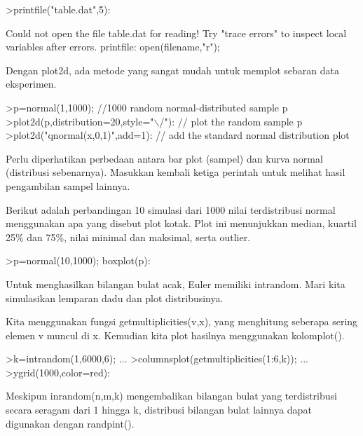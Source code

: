 \documentclass[a4paper,10pt]{article}
\begin{document}
\begin{eulernotebook}
\begin{eulercomment}
\begin{eulercomment}
\begin{eulerprompt}
>printfile("table.dat",5):
\end{eulerprompt}
\begin{euleroutput}
  Could not open the file
  table.dat
  for reading!
  Try "trace errors" to inspect local variables after errors.
  printfile:
      open(filename,"r");
\end{euleroutput}
\begin{eulercomment}
Dengan plot2d, ada metode yang sangat mudah untuk memplot sebaran data
eksperimen.
\end{eulercomment}
\begin{eulerprompt}
>p=normal(1,1000); //1000 random normal-distributed sample p
>plot2d(p,distribution=20,style="\(\backslash\)/"): // plot the random sample p
>plot2d("qnormal(x,0,1)",add=1): // add the standard normal distribution plot
\end{eulerprompt}
\begin{eulercomment}
Perlu diperhatikan perbedaan antara bar plot (sampel) dan kurva normal
(distribusi sebenarnya). Masukkan kembali ketiga perintah untuk
melihat hasil pengambilan sampel lainnya.
\end{eulercomment}
\begin{eulercomment}
Berikut adalah perbandingan 10 simulasi dari 1000 nilai terdistribusi
normal menggunakan apa yang disebut plot kotak. Plot ini menunjukkan
median, kuartil 25\% dan 75\%, nilai minimal dan maksimal, serta
outlier.
\end{eulercomment}
\begin{eulerprompt}
>p=normal(10,1000); boxplot(p):
\end{eulerprompt}
\begin{eulercomment}
Untuk menghasilkan bilangan bulat acak, Euler memiliki intrandom. Mari
kita simulasikan lemparan dadu dan plot distribusinya.

Kita menggunakan fungsi getmultiplicities(v,x), yang menghitung
seberapa sering elemen v muncul di x. Kemudian kita plot hasilnya
menggunakan kolomplot().
\end{eulercomment}
\begin{eulerprompt}
>k=intrandom(1,6000,6);  ...
>columnsplot(getmultiplicities(1:6,k));  ...
>ygrid(1000,color=red):
\end{eulerprompt}
\begin{eulercomment}
Meskipun inrandom(n,m,k) mengembalikan bilangan bulat yang
terdistribusi secara seragam dari 1 hingga k, distribusi bilangan
bulat lainnya dapat digunakan dengan randpint().


\end{eulercomment}
\end{eulercomment}
\end{eulercomment}
\end{eulernotebook}
\end{document}
